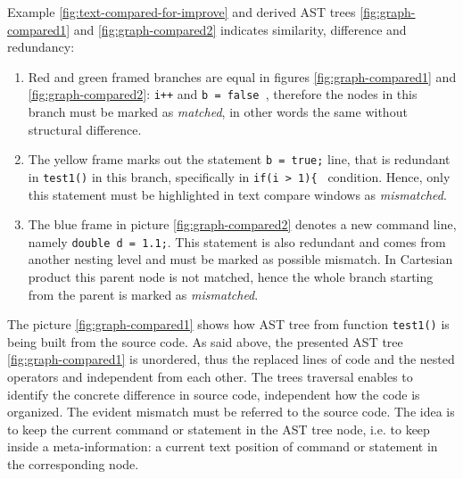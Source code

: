 \documentclass{report}
\begin{document}
Example \ref{fig:text-compared-for-improve} and derived AST trees \ref{fig:graph-compared1} and  \ref{fig:graph-compared2} indicates similarity, difference and redundancy:
\begin{enumerate}
  \item Red and green framed branches are equal in figures \ref{fig:graph-compared1} and \ref{fig:graph-compared2}: \texttt{i++} and \texttt{b = false }, therefore the nodes in this branch must be marked as \emph{matched}, in other words the same without structural difference. 
  
  \item The yellow frame marks out the statement \texttt{b = true;} line, that is redundant in \texttt{test1()} in this branch, specifically in \texttt{if(i > 1)\{ } condition. Hence, only this statement must be highlighted in text compare windows as \emph{mismatched}. 
  
  \item The blue frame in picture \ref{fig:graph-compared2} denotes a new command line, namely \texttt{double d = 1.1;}. This statement is also redundant and comes from another nesting level and must be marked as possible mismatch. In Cartesian product this parent node is not matched, hence the whole branch starting from the parent is marked as \emph{mismatched}.

\end{enumerate}

The picture \ref{fig:graph-compared1} shows how AST tree from function \texttt{test1()} is being built from the source code. As said above, the presented AST tree \ref{fig:graph-compared1} is unordered, thus the replaced lines of code and the nested operators and independent from each other. The trees traversal enables to identify the concrete difference in source code, independent how the code is organized. The evident mismatch must be referred to the source code. The idea is to keep the current command or statement in the AST tree node, i.e. to keep inside a meta-information: a current text position of command or statement in the corresponding node. 
\end{document}
